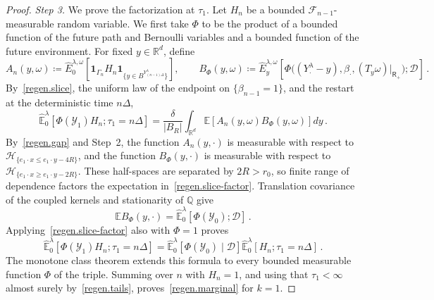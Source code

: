 \documentclass[11pt]{amsart}
\theoremstyle{definition}
\theoremstyle{remark}
\numberwithin{equation}{section}
\newcommand{\E}{\mathbb E}
\newcommand{\Q}{\mathbb Q}
\newcommand{\R}{\mathbb R}
\begin{document}
\begin{proof}
\emph{Step 3.} We prove the factorization at $\tau_1$. Let $H_n$ be a bounded $\mathcal F_{n-1}$-measurable random variable. We first take $\Phi$ to be the product of a bounded function of the future path and Bernoulli variables and a bounded function of the future environment. For fixed $y\in\R^d$, define
\begin{equation*}
 A_n(y,\omega)\coloneqq
 \widehat E^{\lambda,\omega}_0\left[
 \mathbf1_{\Gamma_n}H_n\mathbf1_{\{y\in B^{Y^\lambda_{(n-1)\Delta}}\}}\right],
 \qquad
 B_\Phi(y,\omega)\coloneqq
 \widehat E^{\lambda,\omega}_y\left[
 \Phi\big((Y^\lambda_\cdot-y),\beta_\cdot,(T_y\omega)|_{\mathsf R_+}\big);
 \mathcal D\right]\, .
\end{equation*}
By~\eqref{regen.slice}, the uniform law of the endpoint on $\{\beta_{n-1}=1\}$, and the restart at the deterministic time $n\Delta$,
\begin{equation}\label{regen.slice-factor}
 \widehat{\mathbb E}^\lambda_0[
 \Phi(\mathcal Y_1)H_n;\tau_1=n\Delta]
 =\frac{\delta}{|B_R|}\int_{\mathbb R^d}
 \E[A_n(y,\omega)B_\Phi(y,\omega)]dy\, .
\end{equation}
By~\eqref{regen.gap} and Step~2, the function $A_n(y,\cdot)$ is measurable with respect to $\mathcal H_{\{e_1\cdot x\leq e_1\cdot y-4R\}}$, and the function $B_\Phi(y,\cdot)$ is measurable with respect to $\mathcal H_{\{e_1\cdot x\geq e_1\cdot y-2R\}}$. These half-spaces are separated by $2R>r_0$, so finite range of dependence factors the expectation in~\eqref{regen.slice-factor}. Translation covariance of the coupled kernels and stationarity of $\Q$ give
\begin{equation*}
 \E B_\Phi(y,\cdot)
 =\widehat{\mathbb E}^\lambda_0[\Phi(\mathcal Y_0);\mathcal D]\, .
\end{equation*}
Applying~\eqref{regen.slice-factor} also with $\Phi=1$ proves
\begin{equation}\label{regen.first-factor}
 \widehat{\mathbb E}^\lambda_0[
 \Phi(\mathcal Y_1)H_n;\tau_1=n\Delta]
 =\widehat{\mathbb E}^\lambda_0[\Phi(\mathcal Y_0)\mid\mathcal D]
 \widehat{\mathbb E}^\lambda_0[H_n;\tau_1=n\Delta]\, .
\end{equation}
The monotone class theorem extends this formula to every bounded measurable function $\Phi$ of the triple. Summing over $n$ with $H_n=1$, and using that $\tau_1<\infty$ almost surely by~\eqref{regen.tails}, proves~\eqref{regen.marginal} for $k=1$.


\end{proof}
\end{document}
